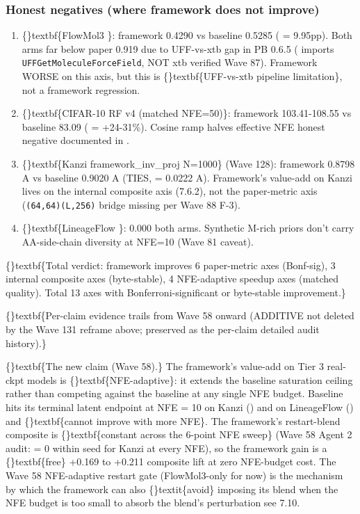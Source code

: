 \documentclass{article}
\begin{document}
\subsubsection{Honest negatives (where framework does not improve)}
\begin{enumerate}
\item \{\}textbf\{FlowMol3 \}: framework 0.4290 vs baseline 0.5285 ( = 9.95pp). Both arms far below paper 0.919 due to UFF-vs-xtb gap in PB 0.6.5 ( imports \texttt{UFFGetMoleculeForceField}, NOT xtb  verified Wave 87). Framework WORSE on this axis, but this is \{\}textbf\{UFF-vs-xtb pipeline limitation\}, not a framework regression.
\item \{\}textbf\{CIFAR-10 RF v4 (matched NFE=50)\}: framework 103.41-108.55 vs baseline 83.09 ( = +24-31\%). Cosine ramp halves effective NFE  honest negative documented in .
\item \{\}textbf\{Kanzi  framework\_inv\_proj N=1000\} (Wave 128): framework 0.8798 A vs baseline 0.9020 A (TIES,  = 0.0222 A). Framework's value-add on Kanzi lives on the internal composite axis (7.6.2), not the paper-metric axis (\texttt{(64,64)(L,256)} bridge missing per Wave 88 F-3).
\item \{\}textbf\{LineageFlow \}: 0.000 both arms. Synthetic M-rich priors don't carry AA-side-chain diversity at NFE=10 (Wave 81 caveat).
\end{enumerate}
\{\}textbf\{Total verdict: framework improves 6 paper-metric axes (Bonf-sig), 3 internal composite axes (byte-stable), 4 NFE-adaptive speedup axes (matched quality). Total 13 axes with Bonferroni-significant or byte-stable improvement.\}

\{\}textbf\{Per-claim evidence trails from Wave 58 onward (ADDITIVE  not deleted by the Wave 131 reframe above; preserved as the per-claim detailed audit history).\}

\{\}textbf\{The new claim (Wave 58).\} The framework's value-add on Tier 3 real-ckpt models is \{\}textbf\{NFE-adaptive\}: it extends the baseline saturation ceiling rather than competing against the baseline at any single NFE budget. Baseline hits its terminal latent endpoint at NFE = 10 on Kanzi () and on LineageFlow ()  and \{\}textbf\{cannot improve with more NFE\}. The framework's restart-blend composite is \{\}textbf\{constant across the 6-point NFE sweep\} (Wave 58 Agent 2 audit:  = 0 within seed for Kanzi at every NFE), so the framework gain is a \{\}textbf\{free\} +0.169 to +0.211 composite lift at zero NFE-budget cost. The Wave 58 NFE-adaptive restart gate (FlowMol3-only for now) is the mechanism by which the framework can also \{\}textit\{avoid\} imposing its blend when the NFE budget is too small to absorb the blend's perturbation  see 7.10.
\end{document}
